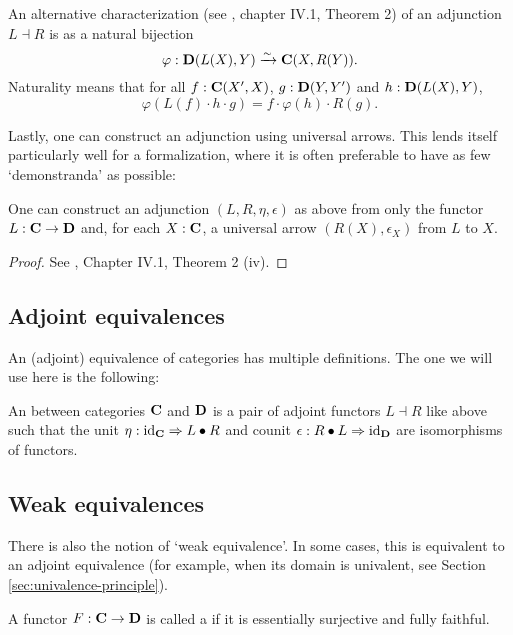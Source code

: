 An alternative characterization (see \autocite{MacLane}, chapter IV.1, Theorem 2) of an adjunction $ L \dashv R $ is as a natural bijection
\[ \varphi: \mathbf{D}(L(X), Y) \xrightarrow{\sim} \mathbf{C}(X, R(Y)). \]
Naturality means that for all $ f: \mathbf{C}(X^\prime, X) $, $ g: \mathbf{D}(Y, Y^\prime) $ and $ h: \mathbf{D}(L(X), Y) $,
\[ \varphi(L(f) \cdot h \cdot g) = f \cdot \varphi(h) \cdot R(g). \]

Lastly, one can construct an adjunction using universal arrows. This lends itself particularly well for a formalization, where it is often preferable to have as few `demonstranda' as possible:
\begin{lemma}
  One can construct an adjunction $ (L, R, \eta, \epsilon) $ as above from only the functor $ L: \mathbf{C} \to \mathbf{D} $ and, for each $ X: \mathbf{C} $, a universal arrow $ (R(X), \epsilon_X) $ from $ L $ to $ X $.
\end{lemma}
\begin{proof}
  See \autocite{MacLane}, Chapter IV.1, Theorem 2 (iv).
\end{proof}

\subsection{Adjoint equivalences}
An (adjoint) equivalence of categories has multiple definitions. The one we will use here is the following:

\begin{definition}\label{def:equivalence-of-categories}
  An  between categories $ \mathbf{C} $ and $ \mathbf{D} $ is a pair of adjoint functors $ L \dashv R $ like above such that the unit $ \eta: \text{id}_{\mathbf{C}} \Rightarrow L \bullet R $ and counit $ \epsilon: R \bullet L \Rightarrow \text{id}_{\mathbf{D}} $ are isomorphisms of functors.
\end{definition}

\subsection{Weak equivalences}
There is also the notion of `weak equivalence'. In some cases, this is equivalent to an adjoint equivalence (for example, when its domain is univalent, see Section \ref{sec:univalence-principle}).
\begin{definition}
  A functor $ F: \mathbf{C} \to \mathbf{D} $ is called a  if it is essentially surjective and fully faithful.
\end{definition}

